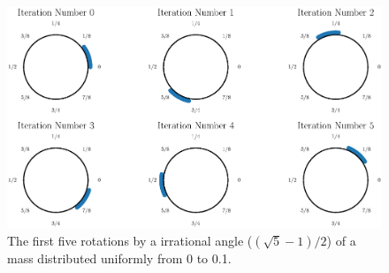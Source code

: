 \documentclass{article}
\begin{document}
\begin{appendices}
\begin{figure}[H]
	\centering
	\includegraphics[scale = 0.6]{Q107_Ulam_Rot_root5.eps}
	\caption{The first five rotations by a irrational angle ($(\sqrt{5}-1)/2$) of a mass distributed uniformly from 0 to 0.1.}
\end{figure}

\end{appendices}
\end{document}
